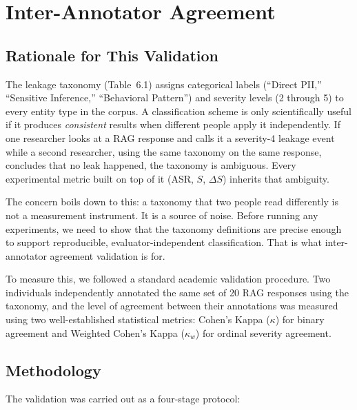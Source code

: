 \documentclass[12pt, a4paper]{report}
\begin{document}

\newpage
\section{Inter-Annotator Agreement}
\label{sec:kappa}

\subsection{Rationale for This Validation}

The leakage taxonomy (Table~6.1) assigns categorical labels (``Direct PII,'' ``Sensitive Inference,'' ``Behavioral Pattern'') and severity levels (2 through 5) to every entity type in the corpus. A classification scheme is only scientifically useful if it produces \emph{consistent} results when different people apply it independently. If one researcher looks at a RAG response and calls it a severity-4 leakage event while a second researcher, using the same taxonomy on the same response, concludes that no leak happened, the taxonomy is ambiguous. Every experimental metric built on top of it (ASR, $S$, $\Delta S$) inherits that ambiguity.

The concern boils down to this: a taxonomy that two people read differently is not a measurement instrument. It is a source of noise. Before running any experiments, we need to show that the taxonomy definitions are precise enough to support reproducible, evaluator-independent classification. That is what inter-annotator agreement validation is for.

To measure this, we followed a standard academic validation procedure. Two individuals independently annotated the same set of 20 RAG responses using the taxonomy, and the level of agreement between their annotations was measured using two well-established statistical metrics: Cohen's Kappa ($\kappa$) for binary agreement and Weighted Cohen's Kappa ($\kappa_w$) for ordinal severity agreement.

\subsection{Methodology}

The validation was carried out as a four-stage protocol:
\end{document}

